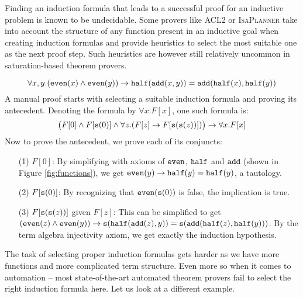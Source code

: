 Finding an induction formula that leads to a successful proof for an inductive problem is known to be undecidable. Some provers like \textsc{ACL2} or \textsc{IsaPlanner} take into account the structure of any function present in an inductive goal when creating induction formulas and provide heuristics to select the most suitable one as the next proof step. Such heuristics are however still relatively uncommon in saturation-based theorem provers.
\begin{example}\label{ex:1}
$$\forall x,y. (\mathtt{even}(x)\land \mathtt{even}(y))\rightarrow \mathtt{half}(\mathtt{add}(x,y))=\mathtt{add}(\mathtt{half}(x),\mathtt{half}(y))$$
A manual proof starts with selecting a suitable induction formula and proving its antecedent. Denoting the formula by $\forall x.F[x]$, one such formula is:
$$\begin{pmatrix}F[0]\land F[\mathtt{s}(0)]\land\forall z.(F[z]\rightarrow F[\mathtt{s}(\mathtt{s}(z))])\end{pmatrix}\rightarrow\forall x.F[x]$$
Now to prove the antecedent, we prove each of its conjuncts:
\begin{enumerate}
	\item[(1)] $F[0]$: By simplifying with axioms of $\mathtt{even}$, $\mathtt{half}$ and $\mathtt{add}$ (shown in Figure \ref{fig:functions}), we get $\mathtt{even}(y)\rightarrow \mathtt{half}(y)=\mathtt{half}(y)$, a tautology.
	\item[(2)] $F[\mathtt{s}(0)]$: By recognizing that $\mathtt{even}(\mathtt{s}(0))$ is false, the implication is true.
	\item[(3)] $F[\mathtt{s}(\mathtt{s}(z))]$ given $F[z]$:
	This can be simplified to get $(\mathtt{even}(z)\land \mathtt{even}(y))\rightarrow \mathtt{s}(\mathtt{half}(\mathtt{add}(z),y))=\mathtt{s}(\mathtt{add}(\mathtt{half}(z),\mathtt{half}(y)))$. By the term algebra injectivity axiom, we get exactly the induction hypothesis.
\end{enumerate}
\end{example}
The task of selecting proper induction formulas gets harder as we have more functions and more complicated term structure. Even more so when it comes to automation -- most state-of-the-art automated theorem provers fail to select the right induction formula here. Let us look at a different example.
